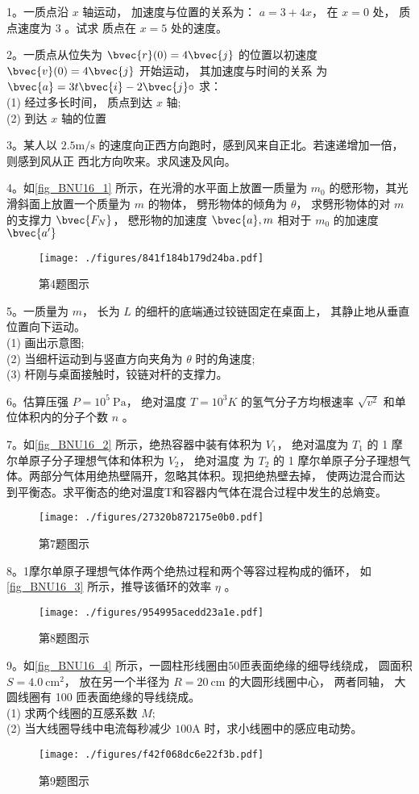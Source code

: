 
1。一质点沿 $x$ 轴运动， 加速度与位置的关系为： $a=3+4 x$， 在 $x=0$ 处， 质点速度为 3 。试求 质点在 $x=5$ 处的速度。

2。一质点从位失为 $\bvec{r}(0)=4 \bvec{j}$ 的位置以初速度 $\bvec{v}(0)=4 \bvec{j}$ 开始运动， 其加速度与时间的关系 为 $\bvec{a}=3 t \bvec{i}-2 \bvec{j} \circ$ 求：\\
(1) 经过多长时间， 质点到达 $x$ 轴;\\
(2) 到达 $x$ 轴的位置

3。某人以 $2.5 \mathrm{m / s}$ 的速度向正西方向跑时，感到风来自正北。若速递增加一倍， 则感到风从正 西北方向吹来。求风速及风向。

4。如\autoref{fig_BNU16_1} 所示，在光滑的水平面上放置一质量为 $m_{0}$ 的憵形物，其光滑斜面上放置一个质量为 $m$ 的物体， 劈形物体的倾角为 $\theta$， 求劈形物体的对 $m$ 的支撑力 $\bvec{F_{N}}$， 憵形物的加速度 $\bvec{a}, m$ 相对于 $m_{0}$ 的加速度 $\bvec{a^{\prime}}$
\begin{figure}[ht]
\centering
\texttt{[image: ./figures/841f184b179d24ba.pdf]}
\caption{第4题图示} \label{fig_BNU16_1}
\end{figure}
5。一质量为 $m$， 长为 $L$ 的细杆的底端通过铰链固定在桌面上， 其静止地从垂直位置向下运动。\\
(1) 画出示意图;\\
(2) 当细杆运动到与竖直方向夹角为 $\theta$ 时的角速度;\\
(3) 杆刚与桌面接触时，铰链对杆的支撑力。

6。估算压强 $P=10^{5} \mathrm{~Pa}$， 绝对温度 $T=10^{3} K$ 的氢气分子方均根速率 $\sqrt{v^{2}}$ 和单位体积内的分子个数 $n$ 。

7。如\autoref{fig_BNU16_2} 所示，绝热容器中装有体积为 $V_{1}$， 绝对温度为 $T_{1}$ 的 1 摩尔单原子分子理想气体和体积为 $V_{2}$， 绝对温度 为 $T_{2}$ 的 1 摩尔单原子分子理想气体。两部分气体用绝热壁隔开，忽略其体积。现把绝热壁去掉， 使两边混合而达到平衡态。求平衡态的绝对温度T和容器内气体在混合过程中发生的总熵变。
\begin{figure}[ht]
\centering
\texttt{[image: ./figures/27320b872175e0b0.pdf]}
\caption{第7题图示} \label{fig_BNU16_2}
\end{figure}
8。1摩尔单原子理想气体作两个绝热过程和两个等容过程构成的循环， 如\autoref{fig_BNU16_3} 所示，推导该循环的效率 $\eta$ 。
\begin{figure}[ht]
\centering
\texttt{[image: ./figures/954995acedd23a1e.pdf]}
\caption{第8题图示} \label{fig_BNU16_3}
\end{figure}
9。如\autoref{fig_BNU16_4} 所示，一圆柱形线圈由50匝表面绝缘的细导线绕成， 圆面积 $S=4.0 \mathrm{~cm}^{2}$， 放在另一个半径为 $R=20 \mathrm{~cm}$ 的大圆形线圈中心， 两者同轴， 大圆线圈有 100 匝表面绝缘的导线绕成。\\
(1) 求两个线圈的互感系数 $M$;\\
(2) 当大线圈导线中电流每秒减少 $100\mathrm{A}$ 时，求小线圈中的感应电动势。
\begin{figure}[ht]
\centering
\texttt{[image: ./figures/f42f068dc6e22f3b.pdf]}
\caption{第9题图示} \label{fig_BNU16_4}
\end{figure}

